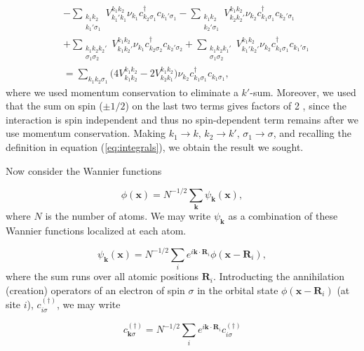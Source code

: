 \documentclass[10pt, twocolumn, twoside]{article}
\begin{document}
\begin{equation}
\begin{split}
&- \sum_{\substack{k_1 k_2 \\ k_1' \sigma_1}} V_{k_1' k_1}^{k_1 k_2} \nu_{k_1} c_{k_2 \sigma_1}^\dagger c_{k_1' \sigma_1}  - \sum_{\substack{k_1 k_2 \\ k_2' \sigma_1}} V_{k_2 k_2'}^{k_1 k_2} \nu_{k_2} c_{k_1 \sigma_1}^\dagger c_{k_2' \sigma_1} \\
&+ \sum_{\substack{k_1 k_2 k_2' \\ \sigma_1 \sigma_2}} V_{k_1 k_2'}^{k_1 k_2} \nu_{k_1} c_{k_2 \sigma_2}^\dagger c_{k_2' \sigma_2}  + \sum_{\substack{k_1 k_2 k_1' \\  \sigma_1 \sigma_2}} V_{k_1' k_2'}^{k_1 k_2} \nu_{k_2} c_{k_1 \sigma_1}^\dagger c_{k_1' \sigma_1} \\
&= \sum_{k_1 k_2 \sigma_1} \bigg( 4 V_{k_1 k_2}^{k_1 k_2} - 2  V_{k_2 k_1}^{k_1 k_2}  \bigg) \nu_{k_2} c_{k_1 \sigma_1}^\dagger c_{k_1 \sigma_1}
,
\end{split}
\end{equation}
where we used momentum conservation to eliminate a $k'$-sum. Moreover, we used that the sum on spin ($\pm 1/2$) on the last two terms gives factors of 2 , since the interaction is spin independent and thus no spin-dependent term remains after we use momentum conservation. Making $k_1 \rightarrow k , \, k_2 \rightarrow k', \, \sigma_1 \rightarrow \sigma$, and recalling the definition in equation (\ref{eq:integrals}), we obtain the result we sought.

Now consider the Wannier functions

\begin{equation}
\phi(\bm x) = N^{-1/2} \sum_{\bm k} \psi_{\bm k} (\bm x) , 
\end{equation}
where $N$ is the number of atoms. We may write $\psi_{\bm k}$ as a  combination of these Wannier functions localized at each atom.

\begin{equation}
\psi_{\bm k} (\bm x) = N^{-1/2} \sum_i e^{i \bm k \cdot \bm R_i} \phi (\bm x - \bm R_i) ,
\end{equation}
where the sum runs over all atomic positions $\bm R_i$. Introducting the annihilation (creation) operators of an electron of spin $\sigma$ in the orbital state $\phi (\bm x - \bm R_i)$ (at site $i$), $c_{i\sigma}^{(\dagger)}$, we may write

\begin{equation}
c_{\bm k \sigma}^{(\dagger)} = N^{-1/2} \sum_i e^{i \bm k \cdot \bm R_i} c_{i\sigma}^{(\dagger)}
\end{equation}
\end{document}
